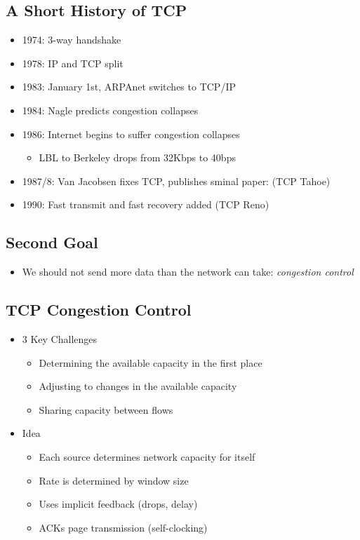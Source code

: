 \subsection{A Short History of TCP}
\begin{itemize}[nosep]
    \item 1974: 3-way handshake
    \item 1978: IP and TCP split
    \item 1983: January 1st, ARPAnet switches to TCP/IP
    \item 1984: Nagle predicts congestion collapses
    \item 1986: Internet begins to suffer congestion collapses
          \begin{itemize}[nosep]
              \item LBL to Berkeley drops from 32Kbps to 40bps
          \end{itemize}
    \item 1987/8: Van Jacobsen fixes TCP, publishes sminal paper: (TCP Tahoe)
    \item 1990: Fast transmit and fast recovery added (TCP Reno)
\end{itemize}

\subsection{Second Goal}
\begin{itemize}[nosep]
    \item We should not send more data than the network can take: \emph{congestion control}
\end{itemize}

\subsection{TCP Congestion Control}
\begin{itemize}[nosep]
    \item 3 Key Challenges
          \begin{itemize}[nosep]
              \item Determining the available capacity in the first place
              \item Adjusting to changes in the available capacity
              \item Sharing capacity between flows
          \end{itemize}
    \item Idea
          \begin{itemize}[nosep]
              \item Each source determines network capacity for itself
              \item Rate is determined by window size
              \item Uses implicit feedback (drops, delay)
              \item ACKs page transmission (self-clocking)
          \end{itemize}
\end{itemize}

